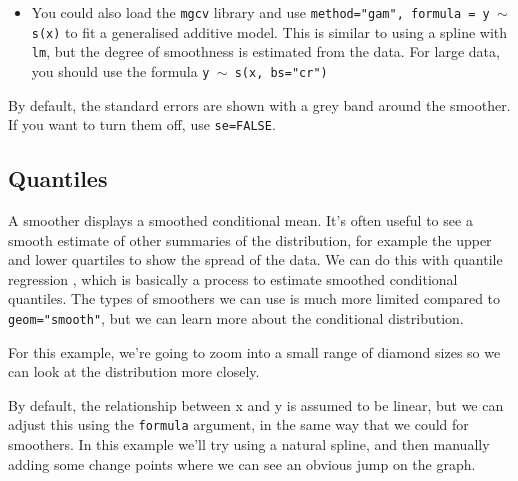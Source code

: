 \begin{itemize}
	\item You could also load the {\tt mgcv} library and use {\tt method="gam", formula = y $\sim$ s(x)} to fit a generalised additive model.  This is similar 
to using a spline with {\tt lm}, but the degree of smoothness is estimated from the data.  For large data, you should use the formula {\tt y $\sim$ s(x, bs="cr")}
 


\end{itemize}

By default, the standard errors are shown with a grey band around the smoother.  If you want to turn them off, use {\tt se=FALSE}.

\subsection{Quantiles}\label{sub:quantiles}

A smoother displays a smoothed conditional mean.  It's often useful to see a smooth estimate of other summaries of the distribution, for example the upper and lower quartiles to show the spread of the data.  We can do this with quantile regression \citep{koenker:2005}, which is basically a process to estimate smoothed conditional quantiles.  The types of smoothers we can use is much more limited compared to {\tt geom="smooth"}, but we can learn more about the conditional distribution.

For this example, we're going to zoom into a small range of diamond sizes so we can look at the distribution more closely.

% 

By default, the relationship between x and y is assumed to be linear, but we can adjust this using the {\tt formula} argument, in the same way that we could for smoothers.  In this example we'll try using a natural spline, and then manually adding some change points where we can see an obvious jump on the graph.

